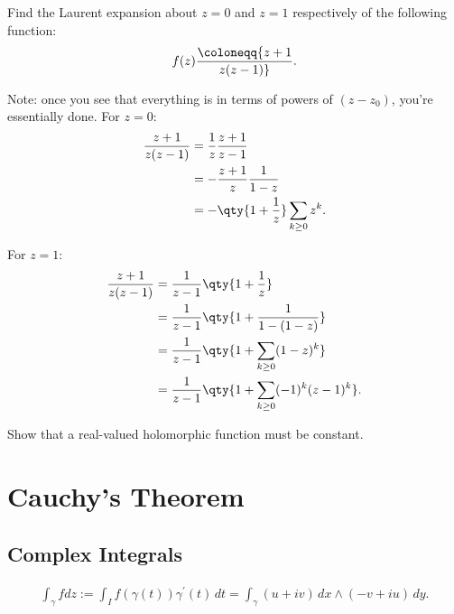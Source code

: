 \begin{exercise}

Find the Laurent expansion about \(z=0\) and \(z=1\) respectively of the
following function:
\begin{align*}
f(z) \coloneqq{z+1 \over z(z-1)}
.\end{align*}

\end{exercise}

\begin{solution}

Note: once you see that everything is in terms of powers of \((z-z_0)\),
you're essentially done. For \(z=0\):
\begin{align*}
{z+1 \over z(z-1)}
&= {1\over z} {z+1 \over z-1} \\
&= -{z+1\over z} {1\over 1-z} \\
&= -\qty{1 + {1\over z}}\sum_{k\geq 0} z^k
.\end{align*}

For \(z=1\):
\begin{align*}
{z+1 \over z(z-1)}
&= {1\over z-1}\qty{1 + {1\over z} } \\
&= {1\over z-1}\qty{1 + {1\over 1 - (1-z)} } \\
&= {1\over z-1} \qty{1 + \sum_{k\geq 0} (1-z)^k } \\
&= {1\over z-1} \qty{1 + \sum_{k\geq 0} (-1)^k (z-1)^k }
.\end{align*}

\end{solution}

\begin{exercise}[?]

Show that a real-valued holomorphic function must be constant.

\end{exercise}

\hypertarget{cauchys-theorem}{%
\section{Cauchy's Theorem}\label{cauchys-theorem}}

\hypertarget{complex-integrals}{%
\subsection{Complex Integrals}\label{complex-integrals}}

\begin{definition}

\begin{align*}
\int_{\gamma} f d z:=\int_{I} f(\gamma(t)) \gamma^{\prime}(t) \,dt
= \int_\gamma (u+iv)\,dx\wedge (-v+iu)\,dy
.\end{align*}

\end{definition}

